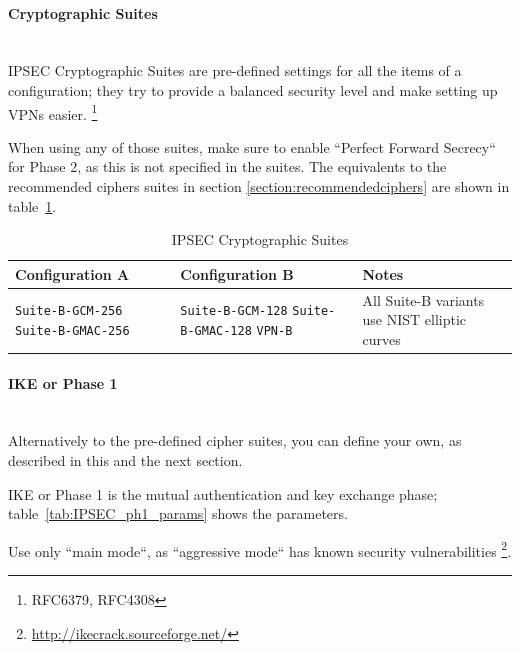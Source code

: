 \begin{description}
\paragraph*{Cryptographic Suites}\mbox{}\\

IPSEC Cryptographic Suites are pre-defined settings for all the items
of a configuration; they try to provide a balanced security level and
make setting up VPNs easier.
\footnote{RFC6379\cite{rfc6379}, RFC4308\cite{rfc4308}}

When using any of those suites, make sure to enable ``Perfect Forward
Secrecy`` for Phase 2, as this is not specified in the suites. The
equivalents to the recommended ciphers suites in section
\ref{section:recommendedciphers} are shown in
table~\ref{tab:IPSEC_suites}.

\begin{table}[h]
  \centering
  \small
  \begin{tabular}{p{2.5cm}p{2.5cm}l}
    \toprule
    Configuration A & Configuration B & Notes\\
    \midrule
    \verb|Suite-B-GCM-256| \newline \verb|Suite-B-GMAC-256| &
    \verb|Suite-B-GCM-128| \newline \verb|Suite-B-GMAC-128| \newline
    \verb|VPN-B| 
    & All Suite-B variants use NIST elliptic curves\\
    \bottomrule
  \end{tabular}
  \caption{IPSEC Cryptographic Suites}
  \label{tab:IPSEC_suites}
\end{table}

\paragraph*{IKE or Phase 1}\mbox{}\\

Alternatively to the pre-defined cipher suites, you can define your
own, as described in this and the next section.

IKE or Phase 1 is the mutual authentication and key exchange phase;
table~\ref{tab:IPSEC_ph1_params} shows the parameters.

Use only ``main mode``, as ``aggressive mode`` has known security
vulnerabilities \footnote{\url{http://ikecrack.sourceforge.net/}}.


\end{description}

